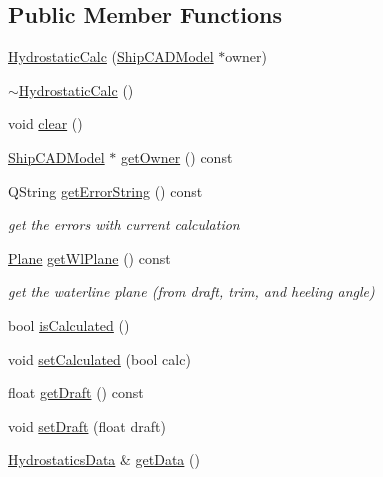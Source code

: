 \subsection*{Public Member Functions}
\begin{DoxyCompactItemize}
\item 
\hyperlink{classShipCAD_1_1HydrostaticCalc_a56877acf4c33b3cab96ce381217c7a3b}{Hydrostatic\+Calc} (\hyperlink{classShipCAD_1_1ShipCADModel}{Ship\+C\+A\+D\+Model} $\ast$owner)
\item 
\hyperlink{classShipCAD_1_1HydrostaticCalc_a382835ae6396b82371b605d662fd1696}{$\sim$\+Hydrostatic\+Calc} ()
\item 
void \hyperlink{classShipCAD_1_1HydrostaticCalc_a09403d93ebe095a41b6a29ba9b740b65}{clear} ()
\item 
\hyperlink{classShipCAD_1_1ShipCADModel}{Ship\+C\+A\+D\+Model} $\ast$ \hyperlink{classShipCAD_1_1HydrostaticCalc_ac1dc0e446e711461bb3747326efd8df6}{get\+Owner} () const 
\item 
Q\+String \hyperlink{classShipCAD_1_1HydrostaticCalc_abfc3e3da906e630cf6b763bd3559c630}{get\+Error\+String} () const 
\begin{DoxyCompactList}\small\item\em get the errors with current calculation \end{DoxyCompactList}\item 
\hyperlink{classShipCAD_1_1Plane}{Plane} \hyperlink{classShipCAD_1_1HydrostaticCalc_a157563b0f0258d21a9be615e092d5b21}{get\+Wl\+Plane} () const 
\begin{DoxyCompactList}\small\item\em get the waterline plane (from draft, trim, and heeling angle) \end{DoxyCompactList}\item 
bool \hyperlink{classShipCAD_1_1HydrostaticCalc_a875b9708e91db4a8f06ddbcc8a22d830}{is\+Calculated} ()
\item 
void \hyperlink{classShipCAD_1_1HydrostaticCalc_a0deeafff07f3bb77184df959bbd91266}{set\+Calculated} (bool calc)
\item 
float \hyperlink{classShipCAD_1_1HydrostaticCalc_a3e1579cbcaddec517cfa95faa2228f2c}{get\+Draft} () const 
\item 
void \hyperlink{classShipCAD_1_1HydrostaticCalc_a6528fe532bbb1121c73972906d108835}{set\+Draft} (float draft)
\item 
\hyperlink{structShipCAD_1_1HydrostaticsData}{Hydrostatics\+Data} \& \hyperlink{classShipCAD_1_1HydrostaticCalc_aabcae04d59358b87b9d5fb4ffda83f1a}{get\+Data} ()

\end{DoxyCompactItemize}
